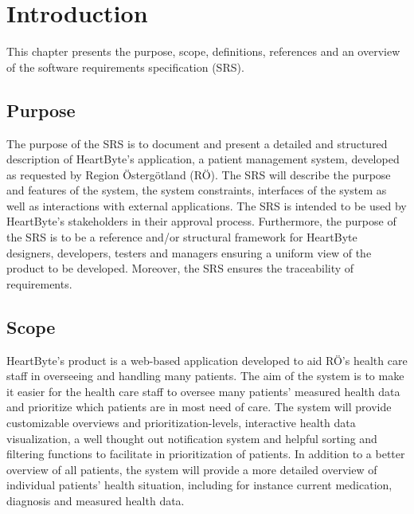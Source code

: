\documentclass{scrreprt}
\begin{document}
\tableofcontents

\chapter{Introduction}
This chapter presents the purpose, scope, definitions, references and an overview of the software requirements specification (SRS). 

\section{Purpose}
The purpose of the SRS is to document and present a detailed and structured description of HeartByte's application, a patient management system, developed as requested by Region Östergötland (RÖ). The SRS will describe the purpose and features of the system, the system constraints, interfaces of the system as well as interactions with external applications. The SRS is intended to be used by HeartByte’s stakeholders in their approval process. Furthermore, the purpose of the SRS is to be a reference and/or structural framework for HeartByte designers, developers, testers and managers ensuring a uniform view of the product to be developed. Moreover, the SRS ensures the traceability of requirements.

\section{Scope}
HeartByte's product is a web-based application developed to aid RÖ's health care staff in overseeing and handling many patients. The aim of the system is to make it easier for the health care staff to oversee many patients' measured health data and prioritize which patients are in most need of care. The system will provide customizable overviews and prioritization-levels, interactive health data visualization, a well thought out notification system and helpful sorting and filtering functions to facilitate in prioritization of patients. In addition to a better overview of all patients, the system will provide a more detailed overview of individual patients' health situation, including for instance current medication, diagnosis and measured health data.
\end{document}
